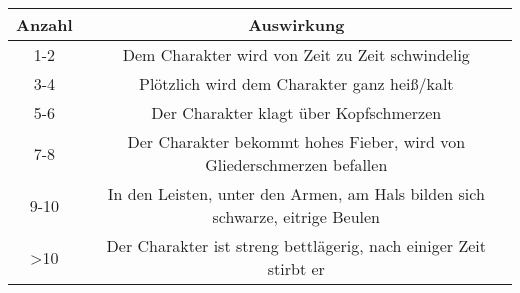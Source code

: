 \begin{tabular}{cc}
  \toprule
  Anzahl & Auswirkung \\
  \midrule
  1-2 & Dem Charakter wird von Zeit zu Zeit schwindelig \\
  3-4 & Plötzlich wird dem Charakter ganz heiß/kalt \\
  5-6 & Der Charakter klagt über Kopfschmerzen \\
  7-8 & Der Charakter bekommt hohes Fieber, wird von Gliederschmerzen befallen \\
  9-10 & In den Leisten, unter den Armen, am Hals bilden sich schwarze, eitrige Beulen \\
  >10 & Der Charakter ist streng bettlägerig, nach einiger Zeit stirbt er \\
  \bottomrule
\end{tabular}
